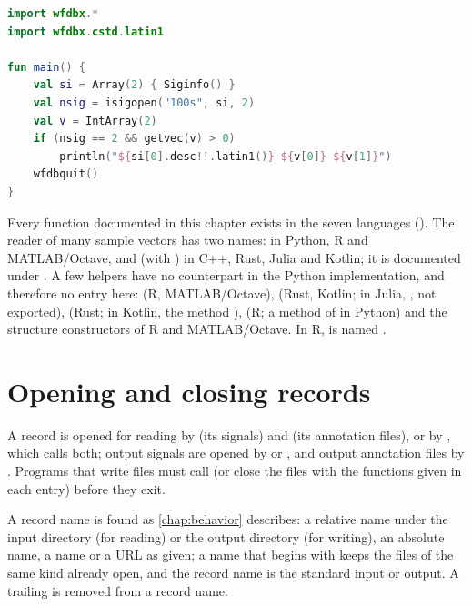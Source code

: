\begin{lstlisting}[language=Kotlin,style=example]
import wfdbx.*
import wfdbx.cstd.latin1

fun main() {
    val si = Array(2) { Siginfo() }
    val nsig = isigopen("100s", si, 2)
    val v = IntArray(2)
    if (nsig == 2 && getvec(v) > 0)
        println("${si[0].desc!!.latin1()} ${v[0]} ${v[1]}")
    wfdbquit()
}
\end{lstlisting}

\begin{note}
Every function documented in this chapter exists in the seven languages
(). The reader of many sample vectors has two names:
 in Python, R and MATLAB/Octave, and  (with
) in C++, Rust, Julia and Kotlin; it is documented under
. A few helpers have no counterpart in the Python
implementation, and therefore no entry here:  (R,
MATLAB/Octave),  (Rust, Kotlin; in Julia,
, not exported), 
(Rust; in Kotlin, the method ),  (R; a method of
 in Python) and the structure constructors of R and
MATLAB/Octave. In R,  is named .
\end{note}

\section{Opening and closing records}
\label{sec:library-open}

A record is opened for reading by  (its signals) and
 (its annotation files), or by , which calls
both; output signals are opened by  or , and
output annotation files by . Programs that write files must call
 (or close the files with the functions given in each entry)
before they exit.

A record name is found as \cref{chap:behavior} describes: a relative name
under the input directory (for reading) or the output directory (for
writing), an absolute name, a \code{\textasciitilde} name or a URL as given; a
name that begins with \code{+} keeps the files of the same kind already open,
and the record name \code{-} is the standard input or output. A trailing
 is removed from a record name.

